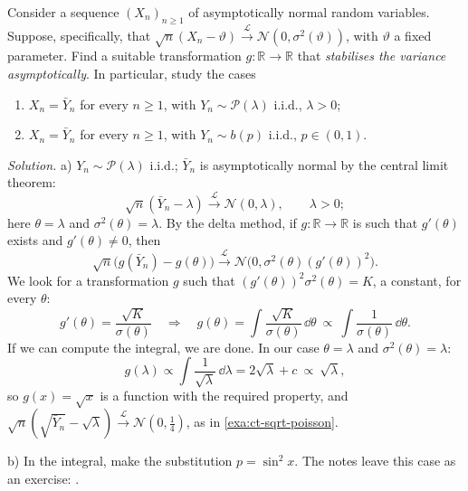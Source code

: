 \begin{example}\label{exa:ct-stabilising}
Consider a sequence $(X_n)_{n\ge1}$ of asymptotically normal random variables. Suppose, specifically,
that $\sqrt n(X_n-\vartheta)\xrightarrow{\mathcal L}\mathcal N(0,\sigma^2(\vartheta))$, with
$\vartheta$ a fixed parameter. Find a suitable transformation $g:\mathbb R\to\mathbb R$ that
\emph{stabilises the variance asymptotically}. In particular, study the cases
\begin{enumerate}[label=\alph*)]
  \item $X_n=\bar Y_n$ for every $n\ge1$, with $Y_n\sim\mathcal P(\lambda)$ i.i.d., $\lambda>0$;
  \item $X_n=\bar Y_n$ for every $n\ge1$, with $Y_n\sim b(p)$ i.i.d., $p\in(0,1)$.
\end{enumerate}

\emph{Solution.} a) $Y_n\sim\mathcal P(\lambda)$ i.i.d.; $\bar Y_n$ is asymptotically normal by the
central limit theorem:
\[
  \sqrt n(\bar Y_n-\lambda)\xrightarrow{\mathcal L}\mathcal N(0,\lambda),\qquad\lambda>0;
\]
here $\theta=\lambda$ and $\sigma^2(\theta)=\lambda$. By the delta method, if $g:\mathbb R\to\mathbb R$
is such that $g'(\theta)$ exists and $g'(\theta)\ne0$, then
\[
  \sqrt n\big(g(\bar Y_n)-g(\theta)\big)\xrightarrow{\mathcal L}\mathcal N\big(0,\sigma^2(\theta)(g'(\theta))^2\big).
\]
We look for a transformation $g$ such that $(g'(\theta))^2\sigma^2(\theta)=K$, a constant, for every
$\theta$:
\[
  g'(\theta)=\frac{\sqrt K}{\sigma(\theta)}\quad\Longrightarrow\quad
  g(\theta)=\int\frac{\sqrt K}{\sigma(\theta)}\,\dd\theta\ \propto\ \int\frac1{\sigma(\theta)}\,\dd\theta .
\]
If we can compute the integral, we are done. In our case $\theta=\lambda$ and
$\sigma^2(\theta)=\lambda$:
\[
  g(\lambda)\propto\int\frac1{\sqrt\lambda}\,\dd\lambda=2\sqrt\lambda+c\ \propto\ \sqrt\lambda ,
\]
so $g(x)=\sqrt x$ is a function with the required property, and
$\sqrt n(\sqrt{\bar Y_n}-\sqrt\lambda)\xrightarrow{\mathcal L}\mathcal N(0,\frac14)$, as in
\cref{exa:ct-sqrt-poisson}.

b) In the integral, make the substitution $p=\sin^2x$. The notes leave this case as an exercise:
.
\end{example}

